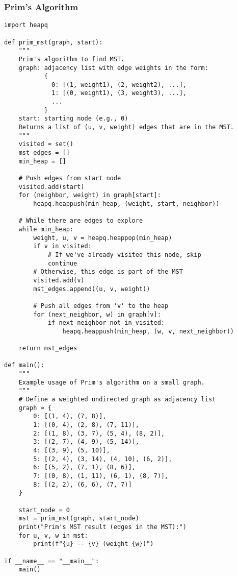 \documentclass[a4paper,12pt]{article}
\begin{document}
\subsubsection{Prim's Algorithm}
\begin{lstlisting}[style=pythonstyle]
import heapq

def prim_mst(graph, start):
    """
    Prim's algorithm to find MST.
    graph: adjacency list with edge weights in the form:
           {
             0: [(1, weight1), (2, weight2), ...],
             1: [(0, weight1), (3, weight3), ...],
             ...
           }
    start: starting node (e.g., 0)
    Returns a list of (u, v, weight) edges that are in the MST.
    """
    visited = set()
    mst_edges = []
    min_heap = []

    # Push edges from start node
    visited.add(start)
    for (neighbor, weight) in graph[start]:
        heapq.heappush(min_heap, (weight, start, neighbor))

    # While there are edges to explore
    while min_heap:
        weight, u, v = heapq.heappop(min_heap)
        if v in visited:
            # If we've already visited this node, skip
            continue
        # Otherwise, this edge is part of the MST
        visited.add(v)
        mst_edges.append((u, v, weight))

        # Push all edges from 'v' to the heap
        for (next_neighbor, w) in graph[v]:
            if next_neighbor not in visited:
                heapq.heappush(min_heap, (w, v, next_neighbor))

    return mst_edges

def main():
    """
    Example usage of Prim's algorithm on a small graph.
    """
    # Define a weighted undirected graph as adjacency list
    graph = {
        0: [(1, 4), (7, 8)],
        1: [(0, 4), (2, 8), (7, 11)],
        2: [(1, 8), (3, 7), (5, 4), (8, 2)],
        3: [(2, 7), (4, 9), (5, 14)],
        4: [(3, 9), (5, 10)],
        5: [(2, 4), (3, 14), (4, 10), (6, 2)],
        6: [(5, 2), (7, 1), (8, 6)],
        7: [(0, 8), (1, 11), (6, 1), (8, 7)],
        8: [(2, 2), (6, 6), (7, 7)]
    }

    start_node = 0
    mst = prim_mst(graph, start_node)
    print("Prim's MST result (edges in the MST):")
    for u, v, w in mst:
        print(f"{u} -- {v} (weight {w})")

if __name__ == "__main__":
    main()
\end{lstlisting}
\end{document}
